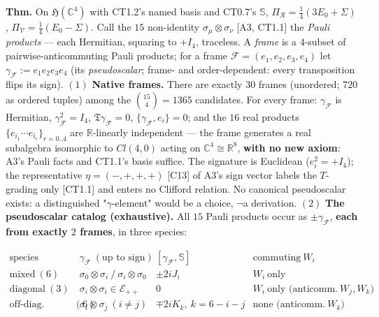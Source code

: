 \begin{theorem}\label{tag:CT1-11b}
\textbf{Thm.} On $\mathfrak H(\mathbb C^4)$ with CT1.2's named basis and CT0.7's $\mathbb S$, $\Pi_{\mathcal R}=\tfrac14(3E_0+\Sigma)$, $\Pi_{\mathcal V}=\tfrac14(E_0-\Sigma)$. Call the $15$ non-identity $\sigma_\mu\otimes\sigma_\nu$ [A3, CT1.1] the \textit{Pauli products} — each Hermitian, squaring to $+I_4$, traceless. A \textit{frame} is a $4$-subset of pairwise-anticommuting Pauli products; for a frame $\mathcal F=(e_1,e_2,e_3,e_4)$ let $\gamma_{\mathcal F}:=e_1e_2e_3e_4$ (its \textit{pseudoscalar}; frame- and order-dependent: every transposition flips its sign). $(1)$ \textbf{Native frames.} There are exactly $30$ frames (unordered; $720$ as ordered tuples) among the $\binom{15}{4}=1365$ candidates. For every frame: $\gamma_{\mathcal F}$ is Hermitian, $\gamma_{\mathcal F}^2=I_4$, $\mathfrak T\gamma_{\mathcal F}=0$, $\{\gamma_{\mathcal F},e_i\}=0$; and the $16$ real products $\{e_{i_1}\cdots e_{i_r}\}_{r=0..4}$ are $\mathbb R$-linearly independent — the frame generates a real subalgebra isomorphic to $Cl(4,0)$ acting on $\mathbb C^4\cong\mathbb R^8$, \textbf{with no new axiom}: A3's Pauli facts and CT1.1's basis suffice. The signature is Euclidean ($e_i^2=+I_4$); the representative $\eta=(-,+,+,+)$ [C13] of A3's sign vector labels the $T$-grading only [CT1.1] and enters no Clifford relation. No canonical pseudoscalar exists: a distinguished "$\gamma$-element" would be a choice, $\neg$a derivation. $(2)$ \textbf{The pseudoscalar catalog (exhaustive).} All $15$ Pauli products occur as $\pm\gamma_{\mathcal F}$, \textbf{each from exactly $2$ frames}, in three species:

\[
\begin{array}{c|c|c|c}
\text{species} & \gamma_{\mathcal F}\ (\text{up to sign}) & [\gamma_{\mathcal F},\mathbb S] & \text{commuting}\ W_i\\ \hline
\text{mixed}\ (6) & \sigma_0\otimes\sigma_i\ /\ \sigma_i\otimes\sigma_0 & \pm2iJ_i & W_i\ \text{only}\\
\text{diagonal}\ (3) & \sigma_i\otimes\sigma_i\in\mathcal E_{++} & 0 & W_i\ \text{only (anticomm.}\ W_j,W_k)\\
\text{off-diag. spatial}\ (6) & \sigma_i\otimes\sigma_j\ (i\ne j) & \mp2iK_k,\ k=6{-}i{-}j & \text{none (anticomm.}\ W_k)
\end{array}
\]


\end{theorem}
